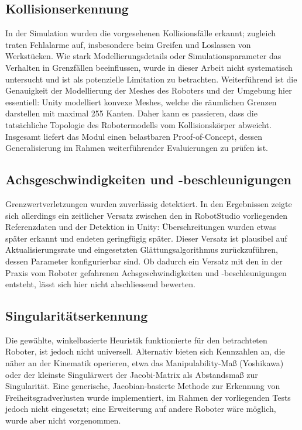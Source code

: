\subsection{Kollisionserkennung}

In der Simulation wurden die vorgesehenen Kollisionsfälle erkannt; zugleich
traten Fehlalarme auf, insbesondere beim Greifen und Loslassen von Werkstücken.
Wie stark Modellierungsdetails oder Simulationsparameter das Verhalten in
Grenzfällen beeinflussen, wurde in dieser Arbeit nicht systematisch untersucht
und ist als potenzielle Limitation zu betrachten. Weiterführend ist die
Genauigkeit der Modellierung der Meshes des Roboters und der Umgebung hier
essentiell: Unity modelliert konvexe Meshes, welche die räumlichen Grenzen
darstellen mit maximal 255 Kanten. Daher kann es passieren, dass die
tatsächliche Topologie des Robotermodells vom Kollisionskörper abweicht.
Insgesamt liefert das Modul einen belastbaren Proof-of-Concept, dessen
Generalisierung im Rahmen weiterführender Evaluierungen zu prüfen ist.

\subsection{Achsgeschwindigkeiten und -beschleunigungen}

Grenzwertverletzungen wurden zuverlässig detektiert. In den Ergebnissen zeigte
sich allerdings ein zeitlicher Versatz zwischen den in RobotStudio vorliegenden
Referenzdaten und der Detektion in Unity: Überschreitungen wurden etwas später
erkannt und endeten geringfügig später. Dieser Versatz ist plausibel auf
Aktualisierungsrate und eingesetzten Glättungsalgorithmus zurückzuführen, dessen
Parameter konfigurierbar sind. Ob dadurch ein Versatz mit den in der Praxis
vom Roboter gefahrenen Achsgeschwindigkeiten und -beschleunigungen entsteht, lässt sich hier
nicht abschliessend bewerten.

\subsection{Singularitätserkennung}

Die gewählte, winkelbasierte Heuristik funktionierte für den betrachteten
Roboter, ist jedoch nicht universell. Alternativ bieten sich Kennzahlen an, die
näher an der Kinematik operieren, etwa das Manipulability-Maß (Yoshikawa) oder
der kleinste Singulärwert der Jacobi-Matrix als Abstandsmaß zur Singularität.
Eine generische, Jacobian-basierte Methode zur Erkennung von
Freiheitsgradverlusten wurde implementiert, im Rahmen der vorliegenden Tests
jedoch nicht eingesetzt; eine Erweiterung auf andere Roboter wäre möglich, wurde
aber nicht vorgenommen.\\

